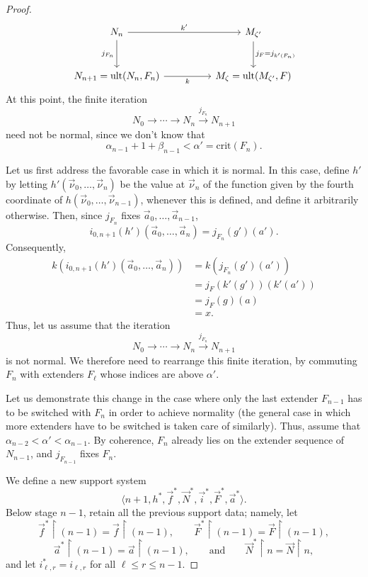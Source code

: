 \documentclass{article}
\theoremstyle{definition}
\theoremstyle{plain}
\newcommand{\la}{\langle}
\newcommand{\ra}{\rangle}
\DeclareMathOperator{\Ult}{ult}
\begin{document}
\begin{proof}
    \[
    \begin{tikzcd}[column sep=huge, row sep=large]
    N_n
        \arrow[r, "k'"]
        \arrow[d, "j_{F_n}"']
    &
    M_{\zeta'}
        \arrow[d, "j_F = j_{k'(F_n)}"]
    \\
    N_{n+1}=\Ult(N_n,F_n)
        \arrow[r, "k"'{name=K}]
    &
    M_{\zeta}=\Ult(M_{\zeta'},F)
    \arrow[from=K, phantom]
    \end{tikzcd}
    \]
At this point, the finite iteration
$$N_0\longrightarrow\cdots\longrightarrow N_n
\overset{j_{F_n}}{\longrightarrow}N_{n+1}$$
need not be normal, since we don't know that
$$\alpha_{n-1}+1+\beta_{n-1}<\alpha'=\text{crit}(F_n).$$

Let us first address the favorable case in which it is normal. In this case, define $h'$ by letting $h'(\vec\nu_0,\ldots,\vec\nu_n)$ be the value at $\vec\nu_n$ of the function given by the fourth coordinate of $h(\vec\nu_0,\ldots,\vec\nu_{n-1})$, whenever this is defined, and define it arbitrarily otherwise. Then, since
$j_{F_n}$ fixes $\vec a_0,\ldots,\vec a_{n-1}$,
$$i_{0,n+1}(h')(\vec a_0,\ldots,\vec a_n)=j_{F_n}(g')(a').$$
Consequently,
\begin{align*}
k\left(
i_{0,n+1}(h')(\vec a_0,\ldots,\vec a_n)
\right)
&=
k\left(j_{F_n}(g')(a')\right)\\
&=
j_F(k'(g'))(k'(a'))\\
&=
j_F(g)(a)\\
&=x.    
\end{align*}
Thus, let us assume that the iteration 
$$N_0\longrightarrow\cdots\longrightarrow N_n
\overset{j_{F_n}}{\longrightarrow}N_{n+1}$$
is not normal. We therefore need to rearrange this finite iteration, by commuting $F_n$ with extenders $F_\ell$ whose indices are above $\alpha'$. 

Let us demonstrate this change in the case where only the last extender $F_{n-1}$ has to be switched with $F_n$ in order to achieve normality (the general case in which more extenders have to be switched is taken care of similarly). Thus, assume that $\alpha_{n-2}<\alpha'<\alpha_{n-1}$. By coherence, $F_n$ already lies on the extender sequence of $N_{n-1}$, and $j_{F_{n-1}}$ fixes $F_n$. 

We define a new support system
$$\la n+1,h^*,\vec f^*,\vec N^*,\vec i^*,\vec F^*,\vec a^*\ra.$$
Below stage $n-1$, retain all the previous support data; namely, let
$$
\vec f^*\restriction(n-1)=\vec f\restriction(n-1),\qquad
\vec F^*\restriction(n-1)=\vec F\restriction(n-1),
$$
$$
\vec a^*\restriction(n-1)=\vec a\restriction(n-1),
\qquad\text{and}\qquad
\vec N^*\restriction n=\vec N\restriction n,
$$
and let $i_{\ell,r}^*=i_{\ell,r}$ for all $\ell\leq r\leq n-1$. 


\end{proof}
\end{document}
